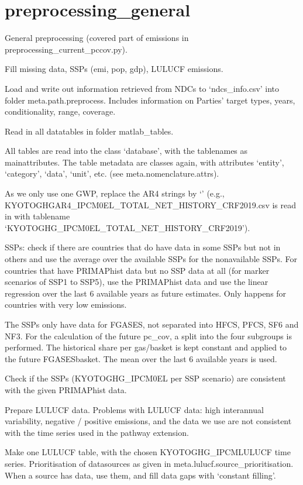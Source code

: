 \documentclass[letterpaper,10pt,english]{sphinxmanual}
\begin{document}
\chapter{preprocessing\_general}
\label{\detokenize{code:preprocessing-general}}
General preprocessing (covered part of emissions in preprocessing\_current\_pccov.py).

Fill missing data, SSPs (emi, pop, gdp), LULUCF emissions.

Load and write out information retrieved from NDCs to ‘ndcs\_info.csv’ into folder meta.path.preprocess.
Includes information on Parties’ target types, years, conditionality, range, coverage.

Read in all datatables in folder matlab\_tables.

All tables are read into the class ‘database’, with the tablenames as main\sphinxhyphen{}attributes.
The table meta\sphinxhyphen{}data are classes again, with attributes ‘entity’, ‘category’,
‘data’, ‘unit’, etc. (see meta.nomenclature.attrs).

As we only use one GWP, replace the AR4 strings by ‘’
(e.g., KYOTOGHGAR4\_IPCM0EL\_TOTAL\_NET\_HISTORY\_CRF2019.csv is read in
with tablename ‘KYOTOGHG\_IPCM0EL\_TOTAL\_NET\_HISTORY\_CRF2019’).

SSPs: check if there are countries that do have data in some SSPs but not in others and use the average over the available SSPs for the non\sphinxhyphen{}available SSPs.
For countries that have PRIMAP\sphinxhyphen{}hist data but no SSP data at all (for marker scenarios of SSP1 to SSP5), use the PRIMAP\sphinxhyphen{}hist data and use the linear regression over the last 6 available years as future estimates.
Only happens for countries with very low emissions.

The SSPs only have data for FGASES, not separated into HFCS, PFCS, SF6 and NF3.
For the calculation of the future pc\_cov, a split into the four subgroups is performed.
The historical share per gas/basket is kept constant and applied to the future FGASES\sphinxhyphen{}basket.
The mean over the last 6 available years is used.

Check if the SSPs (KYOTOGHG\_IPCM0EL per SSP scenario) are consistent with the given PRIMAP\sphinxhyphen{}hist data.

Prepare LULUCF data.
Problems with LULUCF data: high inter\sphinxhyphen{}annual variability, negative / positive emissions,
and the data we use are not consistent with the time series used in the pathway extension.

Make one LULUCF table, with the chosen KYOTOGHG\_IPCMLULUCF time series.
Prioritisation of data\sphinxhyphen{}sources as given in meta.lulucf.source\_prioritisation.
When a source has data, use them, and fill data gaps with ‘constant filling’.
\end{document}
